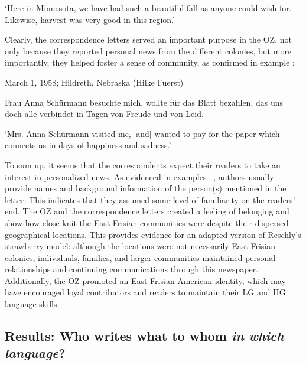\documentclass[output=paper]{langsci/langscibook}
\begin{document}
‘Here in Minnesota, we have had such a beautiful fall as anyone could wish for. Likewise, harvest was very good in this region.’
\z

Clearly, the correspondence letters served an important purpose in the OZ, not only because they reported personal news from the different colonies, but more importantly, they helped foster a sense of community, as confirmed in example : 

 
 \ea
\label{ex:rocker:10}
March 1, 1958; Hildreth, Nebraska (Hilke Fuerst)\smallskip\\\relax 
 
Frau Anna Schürmann besuchte mich, wollte für das Blatt bezahlen, das uns doch alle verbindet in Tagen von Freude und von Leid.\smallskip\\\relax 

‘Mrs. Anna Schürmann visited me, [and] wanted to pay for the paper which connects us in days of happiness and sadness.’ 
\z

To sum up, it seems that the correspondents expect their readers to take an interest in personalized news. As evidenced in examples --, authors usually provide names and background information of the person(s) mentioned in the letter. This indicates that they assumed some level of familiarity on the readers’ end. The OZ and the correspondence letters created a feeling of belonging and show how close-knit the East Frisian communities were despite their dispersed geographical locations. This provides evidence for an adapted version of Reschly’s strawberry model: although the locations were not necessarily East Frisian colonies, individuals, families, and larger communities maintained personal relationships and continuing communications through this newspaper. Additionally, the OZ promoted an East Frisian-American identity, which may have encouraged loyal contributors and readers to maintain their LG and HG language skills.

\subsection{Results: Who writes what to whom \textit{in} \textit{which} \textit{language}?} %
\label{sec:rocker:4.3}
\end{document}
